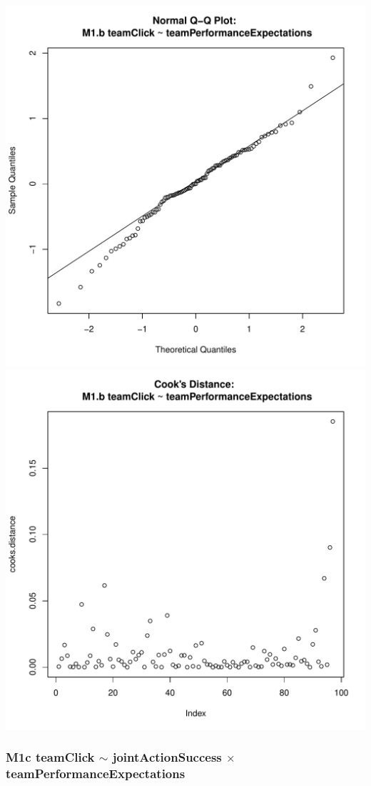 \documentclass[12pt]{report}
\begin{document}
\includegraphics[scale =.4]{../images/MLM1bQQNorm.pdf}
\includegraphics[scale =.4]{../images/MLM1bCooksD.pdf}

\newpage
\subsubsection{M1c teamClick $\sim$ jointActionSuccess $\times$ teamPerformanceExpectations}

\end{document}
